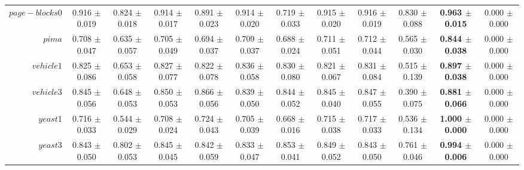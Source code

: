 \begin{table}[!ht]
{\begin{tabular}{r c c c c c c c c c c c}
$page-blocks0$ & 0.916 $\pm$ 0.019 & 0.824 $\pm$ 0.018 & 0.914 $\pm$ 0.017 & 0.891 $\pm$ 0.023 & 0.914 $\pm$ 0.020 & 0.719 $\pm$ 0.033 & 0.915 $\pm$ 0.020 & 0.916 $\pm$ 0.019 & 0.830 $\pm$ 0.088 & \textbf{0.963 $\pm$ 0.015} & 0.000 $\pm$ 0.000 \\
$pima$ & 0.708 $\pm$ 0.047 & 0.635 $\pm$ 0.057 & 0.705 $\pm$ 0.049 & 0.694 $\pm$ 0.037 & 0.709 $\pm$ 0.037 & 0.688 $\pm$ 0.024 & 0.711 $\pm$ 0.051 & 0.712 $\pm$ 0.044 & 0.565 $\pm$ 0.030 & \textbf{0.844 $\pm$ 0.038} & 0.000 $\pm$ 0.000 \\
$vehicle1$ & 0.825 $\pm$ 0.086 & 0.653 $\pm$ 0.058 & 0.827 $\pm$ 0.077 & 0.822 $\pm$ 0.078 & 0.836 $\pm$ 0.058 & 0.830 $\pm$ 0.080 & 0.821 $\pm$ 0.067 & 0.831 $\pm$ 0.084 & 0.515 $\pm$ 0.139 & \textbf{0.897 $\pm$ 0.038} & 0.000 $\pm$ 0.000 \\
$vehicle3$ & 0.845 $\pm$ 0.056 & 0.648 $\pm$ 0.053 & 0.850 $\pm$ 0.053 & 0.866 $\pm$ 0.056 & 0.839 $\pm$ 0.050 & 0.844 $\pm$ 0.052 & 0.845 $\pm$ 0.040 & 0.847 $\pm$ 0.055 & 0.390 $\pm$ 0.075 & \textbf{0.881 $\pm$ 0.066} & 0.000 $\pm$ 0.000 \\
$yeast1$ & 0.716 $\pm$ 0.033 & 0.544 $\pm$ 0.029 & 0.708 $\pm$ 0.024 & 0.724 $\pm$ 0.043 & 0.705 $\pm$ 0.039 & 0.668 $\pm$ 0.016 & 0.715 $\pm$ 0.038 & 0.717 $\pm$ 0.033 & 0.536 $\pm$ 0.134 & \textbf{1.000 $\pm$ 0.000} & 0.000 $\pm$ 0.000 \\
$yeast3$ & 0.843 $\pm$ 0.050 & 0.802 $\pm$ 0.053 & 0.845 $\pm$ 0.045 & 0.842 $\pm$ 0.059 & 0.833 $\pm$ 0.047 & 0.853 $\pm$ 0.041 & 0.849 $\pm$ 0.052 & 0.843 $\pm$ 0.050 & 0.761 $\pm$ 0.046 & \textbf{0.994 $\pm$ 0.006} & 0.000 $\pm$ 0.000 \\
\end{tabular}}
\end{table}
